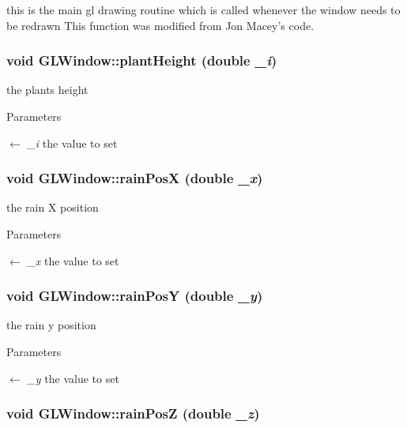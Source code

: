 this is the main gl drawing routine which is called whenever the window needs to be redrawn This function was modified from Jon Macey's code. \hypertarget{classGLWindow_aba4dedcbeb2c00303357e39115f70fe2}{
\subsubsection[{plantHeight}]{\setlength{\rightskip}{0pt plus 5cm}void GLWindow::plantHeight (double {\em \_\-i})}}
\label{classGLWindow_aba4dedcbeb2c00303357e39115f70fe2}


the plants height 
\begin{DoxyParams}{Parameters}
\item[\mbox{$\leftarrow$} {\em \_\-i}]the value to set \end{DoxyParams}
\hypertarget{classGLWindow_af1a5b08eb2fc001198d7cf874fd57818}{
\subsubsection[{rainPosX}]{\setlength{\rightskip}{0pt plus 5cm}void GLWindow::rainPosX (double {\em \_\-x})}}
\label{classGLWindow_af1a5b08eb2fc001198d7cf874fd57818}


the rain X position 
\begin{DoxyParams}{Parameters}
\item[\mbox{$\leftarrow$} {\em \_\-x}]the value to set \end{DoxyParams}
\hypertarget{classGLWindow_a28cf222f0071c315f388806bbda52688}{
\subsubsection[{rainPosY}]{\setlength{\rightskip}{0pt plus 5cm}void GLWindow::rainPosY (double {\em \_\-y})}}
\label{classGLWindow_a28cf222f0071c315f388806bbda52688}


the rain y position 
\begin{DoxyParams}{Parameters}
\item[\mbox{$\leftarrow$} {\em \_\-y}]the value to set \end{DoxyParams}
\hypertarget{classGLWindow_a9f28763b9abe09e2d68f840b3b57340b}{
\subsubsection[{rainPosZ}]{\setlength{\rightskip}{0pt plus 5cm}void GLWindow::rainPosZ (double {\em \_\-z})}}
\label{classGLWindow_a9f28763b9abe09e2d68f840b3b57340b}


